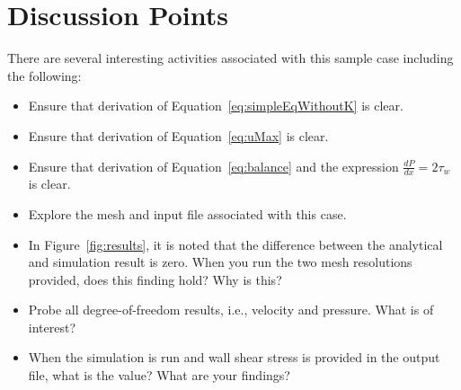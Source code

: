 \documentclass{article}
\begin{document}
\section{Discussion Points}

There are several interesting activities associated with this sample case including
the following:

\begin{itemize}
	\item Ensure that derivation of Equation~\ref{eq:simpleEqWithoutK} is clear.
	\item Ensure that derivation of Equation~\ref{eq:uMax} is clear.
	\item Ensure that derivation of Equation~\ref{eq:balance} and the expression
           $\frac{dP}{dx} = 2\tau_w$ is clear.
	\item Explore the mesh and input file associated with this case.
	\item In Figure~\ref{fig:results}, it is noted that the difference between
          the analytical and simulation result is zero. When you run the two mesh resolutions provided, 
          does this finding hold? Why is this?
        \item Probe all degree-of-freedom results, i.e., velocity and pressure. What is of interest?
        \item When the simulation is run and wall shear stress is provided in the output file,
          what is the value? What are your findings?
\end{itemize}
\end{document}
